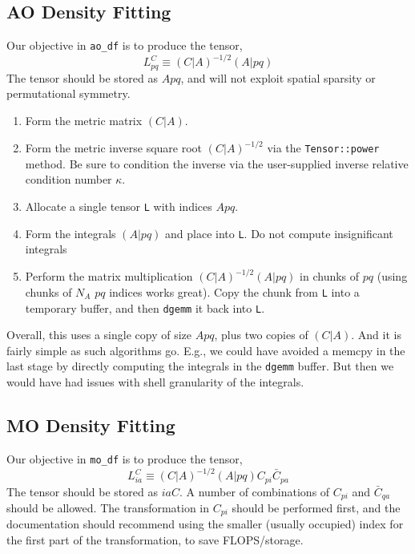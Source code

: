 \documentclass[fleqn,oneside,12pt]{article}
\begin{document}
\subsection{AO Density Fitting}

Our objective in \texttt{ao\_df} is to produce the tensor,
\[
L_{pq}^{C} \equiv (C|A)^{-1/2} (A|pq)
\]
The tensor should be stored as $Apq$, and will not exploit spatial sparsity or
permutational symmetry. 

\begin{enumerate}
\item{Form the metric matrix $(C|A)$.}
\item{Form the metric inverse square root $(C|A)^{-1/2}$ via the
\texttt{Tensor::power} method. Be sure to condition the inverse via the
user-supplied inverse relative condition number $\kappa$.}
\item{Allocate a single tensor \texttt{L} with indices $Apq$.}
\item{Form the integrals $(A|pq)$ and place into \texttt{L}. Do not compute
insignificant integrals}
\item{Perform the matrix multiplication $(C|A)^{-1/2} (A|pq)$ in chunks of $pq$
(using chunks of $N_A$ $pq$ indices works great). Copy the chunk from \texttt{L}
into a temporary buffer, and then \texttt{dgemm} it back into \texttt{L}.}
\end{enumerate}
Overall, this uses a single copy of size $Apq$, plus two copies of $(C|A)$. And
it is fairly simple as such algorithms go. E.g., we could have avoided a memcpy
in the last stage by directly computing the integrals in the \texttt{dgemm}
buffer. But then we would have had issues with shell granularity of the
integrals. 

\subsection{MO Density Fitting}

Our objective in \texttt{mo\_df} is to produce the tensor,
\[
L_{ia}^{C} \equiv (C|A)^{-1/2} (A|pq) C_{pi} \bar C_{pa}
\]
The tensor should be stored as $iaC$. A number of combinations of $C_{pi}$ and
$\bar C_{qa}$ should be allowed. The transformation in $C_{pi}$ should be
performed first, and the documentation should recommend using the smaller
(usually occupied) index for the first part of the transformation, to save
FLOPS/storage. 
\end{document}

